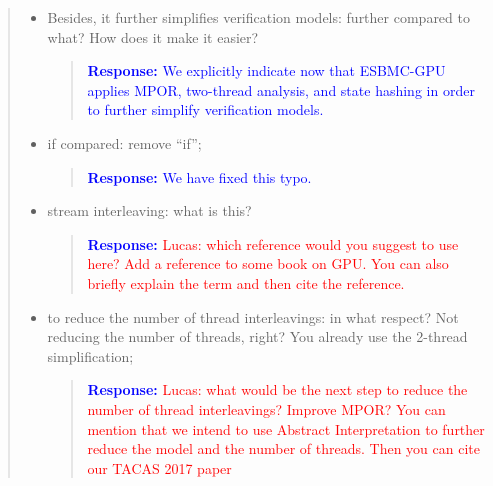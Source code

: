 \documentclass[11pt]{article}
\begin{document}
\begin{quote}
\begin{itemize}
\begin{itemize}
  \item Besides, it further simplifies verification models: further compared to what? How does it make it easier?
  
    \begin{quote}
    \textcolor{blue}{\textbf{Response:} We explicitly indicate now that ESBMC-GPU applies MPOR, two-thread analysis, and state hashing in order to further simplify verification models.}
    \end{quote}

  \item if compared: remove ``if'';
  
    \begin{quote}
    \textcolor{blue}{\textbf{Response:} We have fixed this typo.}
    \end{quote}

  \item stream interleaving: what is this?
  
    \begin{quote}
    \textcolor{blue}{\textbf{Response:} \textcolor{red}{Lucas: which reference would you suggest to use here? Add a reference to some book on GPU. You can also briefly explain the term and then cite the reference.}}
    \end{quote}

  \item  to reduce the number of thread interleavings: in what respect? Not reducing the number of threads, right? You already use the 2-thread simplification;
  
    \begin{quote}
    \textcolor{blue}{\textbf{Response:} \textcolor{red}{Lucas: what would be the next step to reduce the number of thread interleavings? Improve MPOR? You can mention that we intend to use Abstract Interpretation to further reduce the model and the number of threads. Then you can cite our TACAS 2017 paper}}
    \end{quote}

  \end{itemize}
\end{itemize}

\end{quote}

\label{LastPage}

\end{document}

